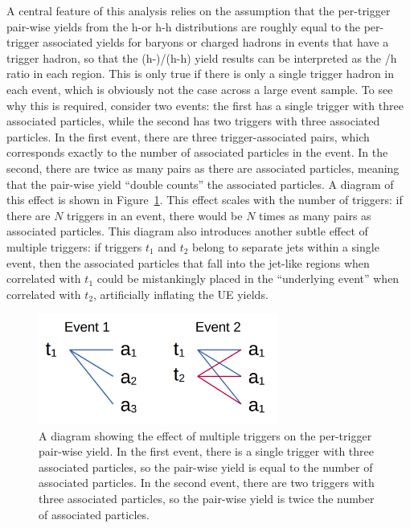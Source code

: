 A central feature of this analysis relies on the assumption that the per-trigger pair-wise yields from the h-\lmb or h-h distributions are roughly equal to the per-trigger associated yields for \lmb baryons or charged hadrons in events that have a trigger hadron, so that the (h-\lmb)/(h-h) yield results can be interpreted as the \lmb/h ratio in each region. This is only true if there is only a single trigger hadron in each event, which is obviously not the case across a large event sample. To see why this is required, consider two events: the first has a single trigger with three associated particles, while the second has two triggers with three associated particles. In the first event, there are three trigger-associated pairs, which corresponds exactly to the number of associated particles in the event. In the second, there are twice as many pairs as there are associated particles, meaning that the pair-wise yield ``double counts'' the associated particles. A diagram of this effect is shown in Figure~\ref{fig:pairwise_counting}. This effect scales with the number of triggers: if there are $N$ triggers in an event, there would be $N$ times as many pairs as associated particles. This diagram also introduces another subtle effect of multiple triggers: if triggers $t_1$ and $t_2$ belong to separate jets within a single event, then the associated particles that fall into the jet-like regions when correlated with $t_1$ could be mistankingly placed in the ``underlying event'' when correlated with $t_2$, artificially inflating the UE yields.

\begin{figure}[ht]
    \centering
    \includegraphics[width=0.7\textwidth]{figures/analysis/pair_counting_diagram.png}
    \caption{A diagram showing the effect of multiple triggers on the per-trigger pair-wise yield. In the first event, there is a single trigger with three associated particles, so the pair-wise yield is equal to the number of associated particles. In the second event, there are two triggers with three associated particles, so the pair-wise yield is twice the number of associated particles.}
    \label{fig:pairwise_counting}
\end{figure}

